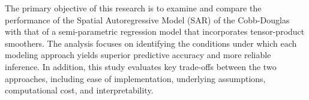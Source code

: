 

The primary objective of this research is to examine and compare the performance
of the Spatial Autoregressive Model (SAR) of the Cobb-Douglas with that of a semi-parametric regression model
that incorporates tensor-product smoothers. The analysis focuses on identifying
the conditions under which each modeling approach yields superior predictive
accuracy and more reliable inference. In addition, this study evaluates key
trade-offs between the two approaches, including ease of implementation,
underlying assumptions, computational cost, and interpretability.

